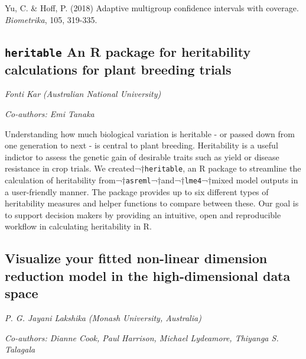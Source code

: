 \documentclass[
]{scrreprt}
\begin{document}
Yu, C. \& Hoff, P. (2018) Adaptive multigroup confidence intervals with
coverage. \emph{Biometrika}, 105, 319-335.

\subsection{\texorpdfstring{\texttt{heritable} An R package for
heritability calculations for plant breeding
trials}{heritable An R package for heritability calculations for plant breeding trials}}\label{heritable-an-r-package-for-heritability-calculations-for-plant-breeding-trials}

\emph{Fonti Kar} \emph{(Australian National
University)}

\emph{Co-authors: Emi Tanaka}

\setlength{\parskip}{0.5em}

Understanding how much biological variation is heritable - or passed
down from one generation to next - is central to plant breeding.
Heritability is a useful indictor to assess the genetic gain of
desirable traits such as yield or disease resistance in crop trials. We
created¬†\texttt{heritable}, an R package to streamline the calculation
of heritability from¬†\texttt{asreml}¬†and¬†\texttt{lme4}¬†mixed model
outputs in a user-friendly manner. The package provides up to six
different types of heritability measures and helper functions to compare
between these. Our goal is to support decision makers by providing an
intuitive, open and reproducible workflow in calculating heritability in
R.

\subsection{Visualize your fitted non-linear dimension reduction model
in the high-dimensional data
space}\label{visualize-your-fitted-non-linear-dimension-reduction-model-in-the-high-dimensional-data-space}

\emph{P. G. Jayani Lakshika} \emph{(Monash
University, Australia)}

\emph{Co-authors: Dianne Cook, Paul Harrison, Michael Lydeamore,
Thiyanga S. Talagala}

\setlength{\parskip}{0.5em}
\end{document}
